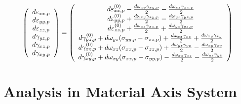 \documentclass[11pt]{book}
\begin{document}
\begin{equation}
   \left(\begin{array}{c} d\varepsilon_{xx,p} \\ d\varepsilon_{yy,p} \\ d\varepsilon_{zz,p} \\ 
   						d\gamma_{yz,p} \\ d\gamma_{xz,p} \\ d\gamma_{xy,p} \end{array}\right) = 
   \left(\begin{array}{c} d\varepsilon_{xx,p}^{(0)} - {d\omega_{xy}\gamma_{xy,p}\over2} - {d\omega_{xz}\gamma_{xz,p}\over2} \\
                d\varepsilon_{yy,p}^{(0)} + {d\omega_{xy}\gamma_{xy,p}\over2} - {d\omega_{yz}\gamma_{yz,p}\over2} \\
                d\varepsilon_{zz,p}^{(0)} + {d\omega_{xz}\gamma_{xz,p}\over2} + {d\omega_{yz}\gamma_{yz,p}\over2} \\
                d\gamma_{yz,p}^{(0)} + {d\omega_{yz}}(\sigma_{yy,p}-\sigma_{zz,p})
                      + {d\omega_{xz}\gamma_{xz}\over 2} + {d\omega_{xy}\gamma_{xy}\over 2}   \\
                d\gamma_{xz,p}^{(0)} + {d\omega_{xz}}(\sigma_{xx,p}-\sigma_{zz,p})
                      + {d\omega_{yz}\gamma_{yz}\over 2} - {d\omega_{xy}\gamma_{xy}\over 2}   \\
                d\gamma_{xy,p}^{(0)} + {d\omega_{xy}}(\sigma_{xx,p}-\sigma_{yy,p})
                      - {d\omega_{xz}\gamma_{xz}\over 2} - {d\omega_{yz}\gamma_{yz}\over 2}
           \end{array}\right)
\end{equation}

\section{Analysis in Material Axis System}
\end{document}
